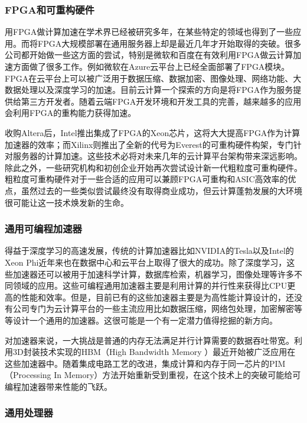 \subsubsection{FPGA和可重构硬件}

用FPGA做计算加速在学术界已经被研究多年，在某些特定的领域也得到了一些应用。而将FPGA大规模部署在通用服务器上却是最近几年才开始取得的突破。很多公司都开始做一些这方面的尝试，特别是微软和百度在有效利用FPGA做云计算加速方面做了很多工作。例如微软在Azure云平台上已经全面部署了FPGA模块。FPGA在云平台上可以被广泛用于数据压缩、数据加密、图像处理、网络功能、大数据处理以及深度学习的加速。目前云计算一个探索的方向是将FPGA作为服务提供给第三方开发者。随着云端FPGA开发环境和开发工具的完善，越来越多的应用会利用FPGA的重构能力获得加速。

收购Altera后，Intel推出集成了FPGA的Xeon芯片，这将大大提高FPGA作为计算加速器的效率；而Xilinx则推出了全新的代号为Everest的可重构硬件构架，专门针对服务器的计算加速。这些技术必将对未来几年的云计算平台架构带来深远影响。除此之外，一些研究机构和初创企业开始再次尝试设计新一代粗粒度可重构硬件。粗粒度可重构硬件对于一些合适的应用可以兼顾FPGA可重构和ASIC高效率的优点，虽然过去的一些类似尝试最终没有取得商业成功，但云计算蓬勃发展的大环境很可能让这一技术焕发新的生命。

\subsubsection{通用可编程加速器}

得益于深度学习的高速发展，传统的计算加速器比如NVIDIA的Tesla以及Intel的Xeon Phi近年来也在数据中心和云平台上取得了很大的成功。除了深度学习，这些加速器还可以被用于加速科学计算，数据库检索，机器学习，图像处理等许多不同领域的应用。这些可编程通用加速器主要是利用计算的并行性来获得比CPU更高的性能和效率。但是，目前已有的这些加速器主要是为高性能计算设计的，还没有公司专门为云计算平台的一些主流应用比如数据压缩，网络包处理，加密解密等等设计一个通用的加速器。这很可能是一个有一定潜力值得挖掘的新方向。

对加速器来说，一大挑战是普通的内存无法满足并行计算需要的数据吞吐带宽。利用3D封装技术实现的HBM（High Bandwidth Memory ）最近开始被广泛应用在这些加速器中。随着集成电路工艺的改进，集成计算和内存于同一芯片的PIM（Processing In Memory）方法开始重新受到重视，在这个技术上的突破可能给可编程加速器带来性能的飞跃。

\subsubsection{通用处理器}


